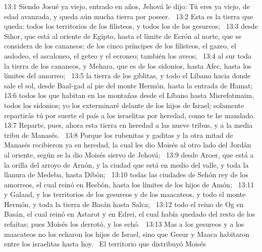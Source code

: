 13:1 Siendo Josué ya viejo, entrado en años, Jehová le dijo: Tú eres ya viejo, de edad avanzada, y queda aún mucha tierra por poseer.  
13:2 Esta es la tierra que queda: todos los territorios de los filisteos, y todos los de los gesureos;  
13:3 desde Sihor, que está al oriente de Egipto, hasta el límite de Ecrón al norte, que se considera de los cananeos; de los cinco príncipes de los filisteos, el gazeo, el asdodeo, el ascaloneo, el geteo y el ecroneo; también los aveos;  
13:4 al sur toda la tierra de los cananeos, y Mehara, que es de los sidonios, hasta Afec, hasta los límites del amorreo;  
13:5 la tierra de los giblitas, y todo el Líbano hacia donde sale el sol, desde Baal-gad al pie del monte Hermón, hasta la entrada de Hamat;  
13:6 todos los que habitan en las montañas desde el Líbano hasta Misrefotmaim, todos los sidonios; yo los exterminaré delante de los hijos de Israel; solamente repartirás tú por suerte el país a los israelitas por heredad, como te he mandado.  
13:7 Reparte, pues, ahora esta tierra en heredad a las nueve tribus, y a la media tribu de Manasés.  
13:8 Porque los rubenitas y gaditas y la otra mitad de Manasés recibieron ya su heredad, la cual les dio Moisés al otro lado del Jordán al oriente, según se la dio Moisés siervo de Jehová;  
13:9 desde Aroer, que está a la orilla del arroyo de Arnón, y la ciudad que está en medio del valle, y toda la llanura de Medeba, hasta Dibón;  
13:10 todas las ciudades de Sehón rey de los amorreos, el cual reinó en Hesbón, hasta los límites de los hijos de Amón;  
13:11 y Galaad, y los territorios de los gesureos y de los maacateos, y todo el monte Hermón, y toda la tierra de Basán hasta Salca;  
13:12 todo el reino de Og en Basán, el cual reinó en Astarot y en Edrei, el cual había quedado del resto de los refaítas; pues Moisés los derrotó, y los echó.  
13:13 Mas a los gesureos y a los maacateos no los echaron los hijos de Israel, sino que Gesur y Maaca habitaron entre los israelitas hasta hoy.  
El territorio que distribuyó Moisés  

